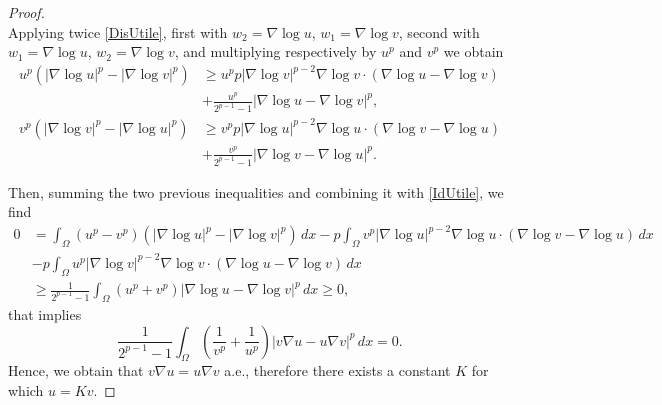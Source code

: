 \documentclass[12pt]{article}
\newcommand{\abs}[1]{{\left|#1\right|}}
\theoremstyle{definition}
\theoremstyle{plain}
\theoremstyle{definition}
\begin{document}
\begin{proof}
\begin{equation}
    \end{equation}
    Applying twice \eqref{DisUtile}, first with $w_2=\nabla\log u$,  $w_1=\nabla\log v$, second with $w_1=\nabla\log u$,  $w_2=\nabla\log v$, and multiplying respectively by $u^p$ and $v^p$ we obtain
    \begin{equation*}
        \begin{split}
            u^p\left(\abs{\nabla \log u}^p-\abs{\nabla\log v}^p \right)&\geq u^pp\abs{\nabla\log v}^{p-2}\nabla\log v\cdot (\nabla\log u-\nabla\log v) \\
            &+\frac{u^p}{2^{p-1}-1}\abs{\nabla\log u-\nabla\log v}^p,\\
            v^p\left(\abs{\nabla \log v}^p-\abs{\nabla\log u}^p \right)&\geq v^pp\abs{\nabla\log u}^{p-2}\nabla\log u\cdot (\nabla\log v-\nabla\log u) \\
            &+\frac{v^p}{2^{p-1}-1}\abs{\nabla\log v-\nabla\log u}^p.
        \end{split}
    \end{equation*}
    
    Then, summing the two previous inequalities and combining it with \eqref{IdUtile}, we find
    \begin{equation*}
        \begin{split}
            0&=\int_\Omega(u^p-v^p)\left(\abs{\nabla \log u}^p-\abs{\nabla\log v}^p \right)\,dx-p\int_\Omega v^p\abs{\nabla\log u}^{p-2}\nabla\log u\cdot(\nabla\log v-\nabla\log u)\,dx\\
            &-p\int_\Omega u^p\abs{\nabla\log v}^{p-2}\nabla\log v\cdot(\nabla\log u-\nabla\log v)\,dx\\
            &\geq\frac{1}{2^{p-1}-1}\int_\Omega (u^p+v^p)\abs{\nabla\log u-\nabla\log v}^p\,dx\geq0,
        \end{split}
    \end{equation*}
    that implies
    \begin{equation*}
        \frac{1}{2^{p-1}-1}\int_\Omega\left(\frac{1}{v^p}+\frac{1}{u^p}\right)\abs{v\nabla u-u\nabla v}^p\,dx=0.
    \end{equation*}
    Hence, we obtain that $v\nabla u=u\nabla v$ a.e., therefore there exists a constant $K$ for which $u=Kv$.
\end{proof} 
\end{document}
